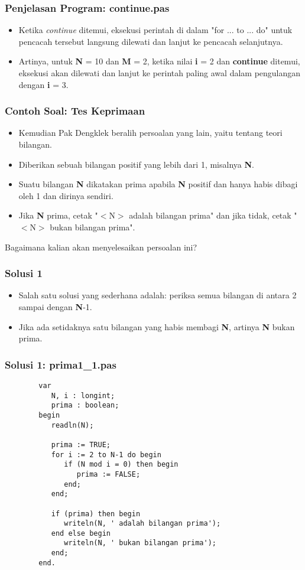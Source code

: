 \documentclass{beamer}
\begin{document}
\begin{frame}
\frametitle{Penjelasan Program: continue.pas}
\begin{itemize}
	\item Ketika \textit{continue} ditemui, eksekusi perintah di dalam "for ... to ... do" untuk pencacah tersebut langsung dilewati dan lanjut ke pencacah selanjutnya.
	\item Artinya, untuk \textbf{N} = 10 dan \textbf{M} = 2, ketika nilai \textbf{i} = 2 dan \textbf{continue} ditemui, eksekusi akan dilewati dan lanjut ke perintah paling awal dalam pengulangan dengan \textbf{i} = 3. 
\end{itemize}
\end{frame}


\begin{frame}
\frametitle{Contoh Soal: Tes Keprimaan}
\begin{itemize}
	\item Kemudian Pak Dengklek beralih persoalan yang lain, yaitu tentang teori bilangan.
	\item Diberikan sebuah bilangan positif yang lebih dari 1, misalnya \textbf{N}.
	\item Suatu bilangan \textbf{N} dikatakan prima apabila \textbf{N} positif dan hanya habis dibagi oleh 1 dan dirinya sendiri.
	\item Jika \textbf{N} prima, cetak "$<$N$>$ adalah bilangan prima" dan jika tidak, cetak "$<$N$>$ bukan bilangan prima".
\end{itemize}
Bagaimana kalian akan menyelesaikan persoalan ini?
\end{frame}

\begin{frame}
\frametitle{Solusi 1}
\begin{itemize}
	\item Salah satu solusi yang sederhana adalah: periksa semua bilangan di antara 2 sampai dengan \textbf{N}-1.
	\item Jika ada setidaknya satu bilangan yang habis membagi \textbf{N}, artinya \textbf{N} bukan prima.
\end{itemize}
\end{frame}


\begin{frame}[fragile]
\frametitle{Solusi 1: prima1\_1.pas}
	\begin{lstlisting}
		var
		   N, i : longint;
		   prima : boolean;
		begin
		   readln(N);
		
		   prima := TRUE;
		   for i := 2 to N-1 do begin
		      if (N mod i = 0) then begin
		         prima := FALSE;
		      end;
		   end;
		
		   if (prima) then begin
		      writeln(N, ' adalah bilangan prima');
		   end else begin
		      writeln(N, ' bukan bilangan prima');
		   end;
		end.
	\end{lstlisting}
\end{frame}
\end{document}
